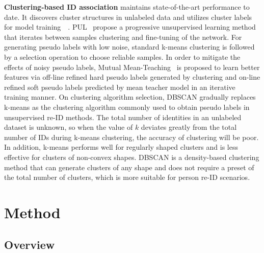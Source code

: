\documentclass[10pt,twocolumn,letterpaper]{article}
\begin{document}
\noindent \textbf{Clustering-based ID association} maintains state-of-the-art performance to date. It discovers cluster structures in unlabeled data and utilizes cluster labels for model training~\cite{cluster1}~\cite{cluster2}. PUL~\cite{pul} propose a progressive unsupervised learning method that iterates between samples clustering and fine-tuning of the network. For generating pseudo labels with low noise, standard k-means clustering is followed by a selection operation to choose reliable samples. In order to mitigate the effects of noisy pseudo labels, Mutual Mean-Teaching~\cite{mmt} is proposed to learn better features via off-line refined hard pseudo labels generated by clustering and on-line refined soft pseudo labels predicted by mean teacher model in an iterative training manner. On clustering algorithm selection, DBSCAN gradually replaces k-means as the clustering algorithm commonly used to obtain pseudo labels in unsupervised re-ID methods. The total number of identities in an unlabeled dataset is unknown, so when the value of $k$ deviates greatly from the total number of IDs during k-means clustering, the accuracy of clustering will be poor. In addition, k-means performs well for regularly shaped clusters and is 
less effective for clusters of non-convex shapes. DBSCAN is a density-based clustering method that can generate clusters of any shape and does not require a preset of the total number of clusters, which is more suitable for person re-ID scenarios.

\section{Method}

\subsection{Overview}
\end{document}
